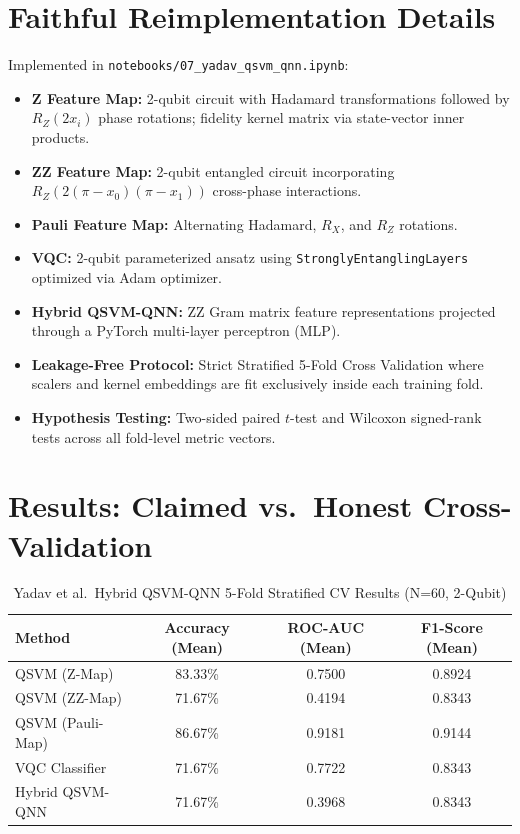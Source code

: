 \documentclass[12pt,a4paper]{article}
\begin{document}
\section{Faithful Reimplementation Details}
Implemented in \texttt{notebooks/07\_yadav\_qsvm\_qnn.ipynb}:
\begin{itemize}[leftmargin=*]
  \item \textbf{Z Feature Map:} 2-qubit circuit with Hadamard transformations followed by $R_Z(2x_i)$ phase rotations; fidelity kernel matrix via state-vector inner products.
  \item \textbf{ZZ Feature Map:} 2-qubit entangled circuit incorporating $R_Z(2(\pi - x_0)(\pi - x_1))$ cross-phase interactions.
  \item \textbf{Pauli Feature Map:} Alternating Hadamard, $R_X$, and $R_Z$ rotations.
  \item \textbf{VQC:} 2-qubit parameterized ansatz using \texttt{StronglyEntanglingLayers} optimized via Adam optimizer.
  \item \textbf{Hybrid QSVM-QNN:} ZZ Gram matrix feature representations projected through a PyTorch multi-layer perceptron (MLP).
  \item \textbf{Leakage-Free Protocol:} Strict Stratified 5-Fold Cross Validation where scalers and kernel embeddings are fit exclusively inside each training fold.
  \item \textbf{Hypothesis Testing:} Two-sided paired $t$-test and Wilcoxon signed-rank tests across all fold-level metric vectors.
\end{itemize}

\section{Results: Claimed vs.\ Honest Cross-Validation}
\begin{table}[h!]
  \centering
  \caption{Yadav et al.\ Hybrid QSVM-QNN 5-Fold Stratified CV Results (N=60, 2-Qubit)}
  \begin{tabular}{lccc}
    \toprule
    \textbf{Method} & \textbf{Accuracy (Mean)} & \textbf{ROC-AUC (Mean)} & \textbf{F1-Score (Mean)}\\
    \midrule
    QSVM (Z-Map)     & 83.33\% & 0.7500 & 0.8924\\
    QSVM (ZZ-Map)    & 71.67\% & 0.4194 & 0.8343\\
    QSVM (Pauli-Map) & 86.67\% & 0.9181 & 0.9144\\
    VQC Classifier   & 71.67\% & 0.7722 & 0.8343\\
    Hybrid QSVM-QNN  & 71.67\% & 0.3968 & 0.8343\\
    \bottomrule
  \end{tabular}
\end{table}
\end{document}
